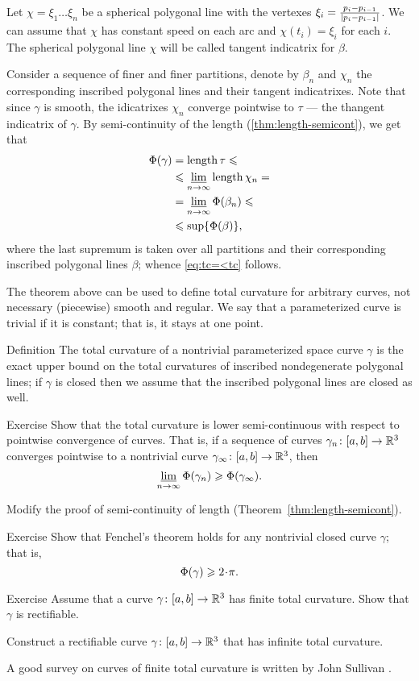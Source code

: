 Let $\chi=\xi_1\dots\xi_n$ be a spherical polygonal line
with the vertexes $\xi_i\z=\tfrac{p_i-p_{i-1}}{|p_i-p_{i-1}|}$.
We can assume that $\chi$ has constant speed on each arc and $\chi(t_i)=\xi_i$ for each $i$. 
The spherical polygonal line $\chi$ will be called tangent indicatrix for $\beta$.

Consider a sequence of finer and finer partitions, denote by $\beta_n$ and $\chi_n$ the corresponding inscribed polygonal lines and their tangent indicatrixes.
Note that since $\gamma$ is smooth, the idicatrixes $\chi_n$ converge pointwise to $\tau$ --- the thangent indicatrix of $\gamma$.
By semi-continuity of the length (\ref{thm:length-semicont}), we get that  
\begin{align*}
\Phi({\gamma})&=\mathop{\rm length}\nolimits \tau\leqslant  
\\
&\leqslant \varliminf_{n\to\infty}\mathop{\rm length}\nolimits \chi_n=
\\
&= \varliminf_{n\to\infty}\Phi({\beta_n})\leqslant
\\
&\leqslant \sup\{\Phi({\beta})\},
\end{align*}
where the last supremum is taken over all partitions and their corresponding inscribed polygonal lines $\beta$; whence \ref{eq:tc=<tc} follows.
\qeds

The theorem above can be used to define total curvature for arbitrary curves, not necessary (piecewise) smooth and regular. 
We say that a parameterized curve is trivial if it is constant; that is, it stays at one point.

\begin{thm}{Definition}\label{def:total-curv-poly}
The total curvature of a nontrivial parameterized space curve $\gamma$ is the exact upper bound on the total curvatures of inscribed nondegenerate polygonal lines;
if $\gamma$ is closed then we assume that the inscribed polygonal lines are closed as well.
\end{thm}

\begin{thm}{Exercise}
Show that the total curvature is lower semi-continuous with respect to pointwise convergence of curves.
That is, if a sequence
of curves $\gamma_n\colon[a,b]\to \mathbb{R}^3$ converges pointwise 
to a nontrivial curve $\gamma_\infty\:[a,b]\z\to \RR^3$, then 
\[\varliminf_{n\to\infty} \Phi({\gamma_n}) \geqslant \Phi({\gamma_\infty}).\]
\end{thm}

 Modify the proof of semi-continuity of length (Theorem~\ref{thm:length-semicont}).

\begin{thm}{Exercise}
Show that Fenchel's theorem holds for any nontrivial closed curve $\gamma$;
that is, 
\[\tc\gamma\ge2\cdot\pi.\]
\end{thm}

\begin{thm}{Exercise} 
Assume that a curve $\gamma\colon[a,b]\to\mathbb{R}^3$ has finite total curvature.
Show that $\gamma$ is rectifiable.

Construct a rectifiable curve $\gamma\colon[a,b]\to\mathbb{R}^3$ that has infinite total curvature.
\end{thm}

A good survey on curves of finite total curvature is written by John Sullivan \cite{sullivan-curves}.


